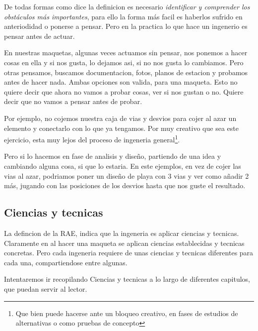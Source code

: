 De todas formas como dice la definicion es necesario \textit{identificar y comprender los
    obstáculos más importantes}, para ello la forma más facil es haberlos sufrido en anteriodidad
o ponerse a pensar. Pero en la practica lo que hace un ingenerio es pensar antes de actuar.

En nuestras maquetas, algunas veces actuamos sin pensar, nos ponemos a hacer cosas en ella y
si nos gusta, lo dejamos asi, si no nos gusta lo cambiamos. Pero otras pensamos, buscamos
documentacion, fotos, planos de estacion y probamos antes de hacer nada. Ambas opciones son
valida, para una maqueta. Esto no quiere decir que ahora no vamos a probar cosas, ver si nos
gustan o no. Quiere decir que no vamos a pensar antes de probar.

Por ejemplo, no cojemos nuestra caja de vias y desvios para cojer al azar un elemento y
conectarlo con lo que ya tengamos. Por muy creativo que sea este ejercicio, esta muy lejos
del proceso de ingeneria general\footnote{Que bien puede hacerse ante un bloqueo creativo,
    en fases de estudios de alternativas o como pruebas de concepto}.

Pero si lo hacemos en fase de analisis y diseño, partiendo de una idea y cambiando alguna
cosa, si que lo estaria. En este ejemplos, en vez de cojer las vias al azar, podriamos poner
un diseño de playa con 3 vias y ver como añadir 2 más, jugando con las posiciones de los
desvios hasta que nos guste el resultado.
\subsection{Ciencias y tecnicas}
La defincion de la RAE, indica que la ingeneria es aplicar ciencias y tecnicas. Claramente en
al hacer una maqueta se aplican ciencias establecidas y tecnicas concretas. Pero cada ingeneria
requiere de unas ciencias y tecnicas diferentes para cada una, compartiendose entre algunas.

Intentaremos ir recopilando Ciencias y tecnicas a lo largo de diferentes capitulos, que puedan
servir al lector.

